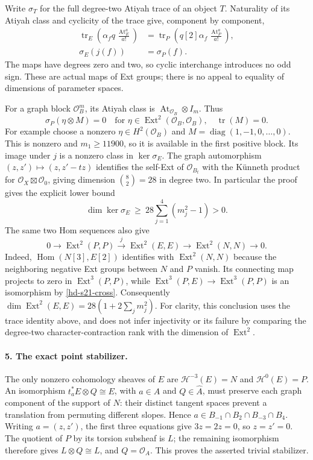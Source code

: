Write $\sigma_T$ for the full degree-two Atiyah trace of an object
$T$. Naturality of its Atiyah class and cyclicity of the trace give,
component by component,
\begin{align*}
 \operatorname{tr}_E\!\left(
   \alpha_fq\,\frac{\operatorname{At}_E^a}{a!}\right)
 &=\operatorname{tr}_P\!\left(
   q[2]\alpha_f\,\frac{\operatorname{At}_P^a}{a!}\right),\\
 \sigma_E(j(f))&=\sigma_P(f).
\end{align*}
The maps have degrees zero and two, so cyclic interchange introduces
no odd sign. These are actual maps of Ext groups; there is no appeal
to equality of dimensions of parameter spaces.

For a graph block $\mathcal O_{B}^{m}$, its Atiyah class is
$\operatorname{At}_{\mathcal O_B}\otimes I_m$. Thus
\[
 \sigma_P(\eta\otimes M)=0
 \quad\text{for }\eta\in\operatorname{Ext}^2(\mathcal O_B,\mathcal O_B),
 \quad\operatorname{tr}(M)=0.
\]
For example choose a nonzero $\eta\in H^2(\mathcal O_B)$ and
$M=\operatorname{diag}(1,-1,0,\ldots,0)$. This is nonzero and
$m_1\ge11900$, so it is available in the first positive block.
Its image under $j$ is a nonzero class in $\ker\sigma_E$.
The graph automorphism $(z,z')\mapsto(z,z'-tz)$ identifies the
self-Ext of $\mathcal O_{B_t}$ with the K\"unneth product for
$\mathcal O_X\boxtimes\mathcal O_0$, giving dimension
$\binom82=28$ in degree two. In particular the proof gives the
explicit lower bound
\[
 \dim\ker\sigma_E\ \ge\ 28\sum_{j=1}^4(m_j^2-1)>0.
\]
The same two Hom sequences also give
\[
 0\longrightarrow\operatorname{Ext}^2(P,P)
 \xrightarrow{j}\operatorname{Ext}^2(E,E)
 \longrightarrow\operatorname{Ext}^2(N,N)\longrightarrow0.
\]
Indeed, $\operatorname{Hom}(N[3],E[2])$ identifies with
$\operatorname{Ext}^2(N,N)$ because the neighboring negative Ext
groups between $N$ and $P$ vanish. Its connecting map projects to
zero in $\operatorname{Ext}^3(P,P)$, while
$\operatorname{Ext}^3(P,E)\to\operatorname{Ext}^3(P,P)$ is an
isomorphism by \eqref{hd-s21-cross}. Consequently
$\dim\operatorname{Ext}^2(E,E)=28(1+2\sum_jm_j^2)$.
For clarity, this conclusion uses the trace identity above, and
does not infer injectivity or its failure by comparing the degree-two
character-contraction rank with the dimension of $\operatorname{Ext}^2$.

\paragraph{5. The exact point stabilizer.}
The only nonzero cohomology sheaves of $E$ are
$\mathcal H^{-3}(E)=N$ and $\mathcal H^0(E)=P$.
An isomorphism $t_a^*E\otimes Q\cong E$, with
$a\in A$ and $Q\in\widehat A$, must preserve each graph component
of the support of $N$: their distinct tangent spaces prevent a
translation from permuting different slopes. Hence
$a\in B_{-1}\cap B_2\cap B_{-3}\cap B_4$.
Writing $a=(z,z')$, the first three equations give $3z=2z=0$,
so $z=z'=0$. The quotient of $P$ by its torsion subsheaf is $L$;
the remaining isomorphism therefore gives $L\otimes Q\cong L$,
and $Q=\mathcal O_A$. This proves the asserted trivial stabilizer.

